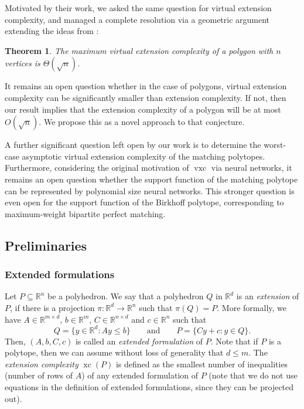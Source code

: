 \documentclass[centering,11pt,reqno]{amsart}
\newtheorem{theorem}{Theorem}[section]
\theoremstyle{definition}
\newcommand{\R}{\mathbb{R}}
\DeclareMathOperator{\xc}{xc}
\DeclareMathOperator{\vxc}{vxc}
\def\R{\mathbb{R}}
\newcommand{\defn}[1]{\emph{#1}}
\begin{document}
Motivated by their work, we asked the same question for virtual extension complexity, and managed a complete resolution via a geometric argument extending the ideas from \cite{LowDimExtensions}: 

\begin{theorem}
\label{thm:main}
The maximum virtual extension complexity of a polygon with $n$ vertices is $\Theta(\sqrt{n})$. 
\end{theorem}

It remains an open question whether in the case of polygons, virtual extension complexity can be significantly smaller than extension complexity. If not, then our result implies that the extension complexity of a polygon will be at most $O(\sqrt{n})$. We propose this as a novel approach to that conjecture. 

A further significant question left open by our work is to determine the worst-case asymptotic virtual extension complexity of the matching polytopes. Furthermore, considering the original motivation of $\vxc$ via neural networks, it remains an open question whether the support function of the matching polytope can be represented by polynomial size neural networks. This stronger question is even open for the support function of the Birkhoff polytope, corresponding to maximum-weight bipartite perfect matching.




\subsection{Preliminaries}


\subsubsection{Extended formulations} Let $P\subseteq\R^n$ be a polyhedron. 
We say that a polyhedron $Q$ in $\R^d$ is an \defn{extension} of $P$, if there is a projection $\pi:\mathbb{R}^d\to\mathbb{R}^n$ such that $\pi(Q)=P$.
More formally, we have $A\in\R^{m\times d}$, $b\in\R^{m}$, $C\in\R^{n\times d}$ and $c\in\R^n$ such that 
\[
    Q=\{y\in\R^d: Ay\le b\}\qquad\text{and}\qquad P=\{Cy+c: y\in Q\}.
\]
Then, $(A,b,C,c)$ is called an \defn{extended formulation} of $P$.
Note that if $P$ is a polytope, then we can assume without loss of generality that $d\le m$.
The \defn{extension complexity} $\xc(P)$ is defined as the smallest number of inequalities (number of rows of $A$) of any extended formulation of $P$ (note that we do not use equations in the definition of extended formulations, since they can be projected out). 
\end{document}
